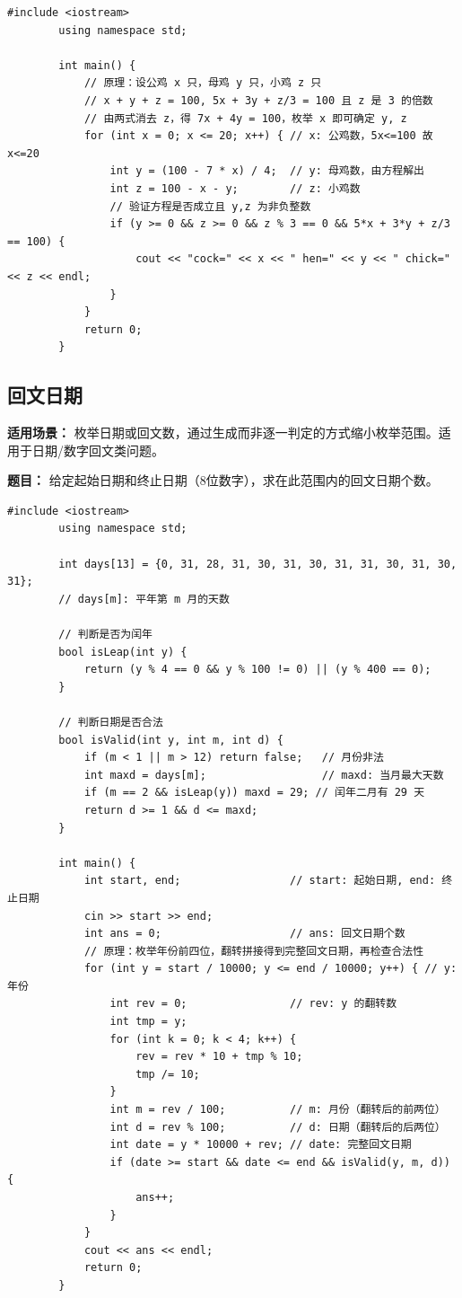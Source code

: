\documentclass[12pt,a4paper]{ctexart}
\begin{document}
	\begin{lstlisting}[caption={百钱百鸡——消元降维枚举}]
		#include <iostream>
		using namespace std;
		
		int main() {
			// 原理：设公鸡 x 只，母鸡 y 只，小鸡 z 只
			// x + y + z = 100, 5x + 3y + z/3 = 100 且 z 是 3 的倍数
			// 由两式消去 z，得 7x + 4y = 100，枚举 x 即可确定 y, z
			for (int x = 0; x <= 20; x++) { // x: 公鸡数，5x<=100 故 x<=20
				int y = (100 - 7 * x) / 4;  // y: 母鸡数，由方程解出
				int z = 100 - x - y;        // z: 小鸡数
				// 验证方程是否成立且 y,z 为非负整数
				if (y >= 0 && z >= 0 && z % 3 == 0 && 5*x + 3*y + z/3 == 100) {
					cout << "cock=" << x << " hen=" << y << " chick=" << z << endl;
				}
			}
			return 0;
		}
	\end{lstlisting}
	
	\subsection{回文日期}
	\textbf{适用场景：} 枚举日期或回文数，通过生成而非逐一判定的方式缩小枚举范围。适用于日期/数字回文类问题。
	
	\textbf{题目：} 给定起始日期和终止日期（8位数字），求在此范围内的回文日期个数。
	
	\begin{lstlisting}[caption={回文日期——枚举前四位生成回文}]
		#include <iostream>
		using namespace std;
		
		int days[13] = {0, 31, 28, 31, 30, 31, 30, 31, 31, 30, 31, 30, 31};
		// days[m]: 平年第 m 月的天数
		
		// 判断是否为闰年
		bool isLeap(int y) {
			return (y % 4 == 0 && y % 100 != 0) || (y % 400 == 0);
		}
		
		// 判断日期是否合法
		bool isValid(int y, int m, int d) {
			if (m < 1 || m > 12) return false;   // 月份非法
			int maxd = days[m];                  // maxd: 当月最大天数
			if (m == 2 && isLeap(y)) maxd = 29; // 闰年二月有 29 天
			return d >= 1 && d <= maxd;
		}
		
		int main() {
			int start, end;                 // start: 起始日期, end: 终止日期
			cin >> start >> end;
			int ans = 0;                    // ans: 回文日期个数
			// 原理：枚举年份前四位，翻转拼接得到完整回文日期，再检查合法性
			for (int y = start / 10000; y <= end / 10000; y++) { // y: 年份
				int rev = 0;                // rev: y 的翻转数
				int tmp = y;
				for (int k = 0; k < 4; k++) {
					rev = rev * 10 + tmp % 10;
					tmp /= 10;
				}
				int m = rev / 100;          // m: 月份（翻转后的前两位）
				int d = rev % 100;          // d: 日期（翻转后的后两位）
				int date = y * 10000 + rev; // date: 完整回文日期
				if (date >= start && date <= end && isValid(y, m, d)) {
					ans++;
				}
			}
			cout << ans << endl;
			return 0;
		}
	\end{lstlisting}
	
\end{document}
